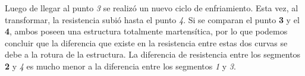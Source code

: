 \documentclass[a4paper,12pt,fleqn,twoside,openany]{book}
\begin{document}
 Luego de llegar al punto \textit{3} se realizó un nuevo ciclo de enfriamiento. Esta vez, al transformar, la resistencia subió hasta el punto \textit{4}. Si se comparan el punto \textbf{3} y el \textbf{4}, ambos poseen una estructura totalmente martensítica, por lo que podemos concluir que la diferencia que existe en la resistencia entre estas dos curvas se debe a la rotura de la estructura. La diferencia de resistencia entre los segmentos \textbf{2} y \textit{4} es mucho menor a la diferencia entre los segmentos \textit{1} y \textit{3}. 
%  
%  
 
 
 
 
 
\vspace{50mm}
 
 
 \vspace{50mm}
 
\end{document}
